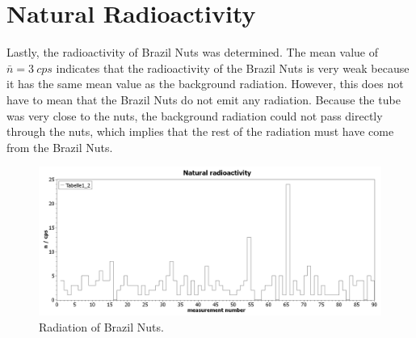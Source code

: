 \section{Natural Radioactivity}
%
Lastly, the radioactivity of Brazil Nuts was determined. The mean value of \( \bar{n}=\SI{3}{cps} \) indicates that the
radioactivity of the Brazil Nuts is very weak because it has the same mean value as the background radiation. However,
this does not have to mean that the Brazil Nuts do not emit any radiation. Because the tube was very close to the nuts,
the background radiation could not pass directly through the nuts, which implies that the rest of the radiation must have
come from the Brazil Nuts.
\begin{figure}[H]
 \centering
 \includegraphics[width=.9\textwidth]{scidavis/Fig.12_Natural radioactivity.jpg}
 \caption[Brazil Nuts]{Radiation of Brazil Nuts.}
 \label{fig:brazilNutz}
\end{figure}
